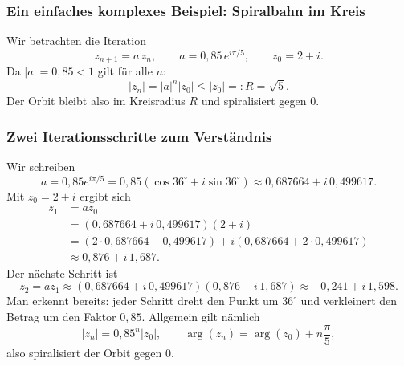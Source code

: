 \subsubsection*{Ein einfaches komplexes Beispiel: Spiralbahn im Kreis}

Wir betrachten die Iteration
\[
z_{n+1}=a\,z_n,\qquad a=0{,}85\,e^{i\pi/5},\qquad z_0=2+i.
\]
Da $|a|=0{,}85<1$ gilt für alle $n$:
\[
|z_n|=|a|^n|z_0|\le |z_0|=:R=\sqrt{5}.
\]
Der Orbit bleibt also im Kreisradius $R$ und spiralisiert gegen $0$.

\subsubsection*{Zwei Iterationsschritte zum Verständnis}

Wir schreiben
\[
a=0{,}85e^{i\pi/5}=0{,}85(\cos36^\circ+i\sin36^\circ)
\approx 0{,}687664+i\,0{,}499617.
\]
Mit $z_0=2+i$ ergibt sich
\begin{align*}
	z_1 &= a z_0\\
	&= (0{,}687664+i\,0{,}499617)(2+i)\\
	&= (2\cdot0{,}687664-0{,}499617)+i(0{,}687664+2\cdot0{,}499617)\\
	&\approx 0{,}876+i\,1{,}687.
\end{align*}
Der nächste Schritt ist
\[
z_2=a z_1\approx (0{,}687664+i\,0{,}499617)(0{,}876+i\,1{,}687)
\approx -0{,}241+i\,1{,}598.
\]
Man erkennt bereits:
jeder Schritt dreht den Punkt um $36^\circ$ und verkleinert den Betrag um den Faktor $0{,}85$.
Allgemein gilt nämlich
\[
|z_n|=0{,}85^n|z_0|,\qquad \arg(z_n)=\arg(z_0)+n\frac{\pi}{5},
\]
also spiralisiert der Orbit gegen $0$.

\begin{figure}[h]
	\centering
\end{figure}

